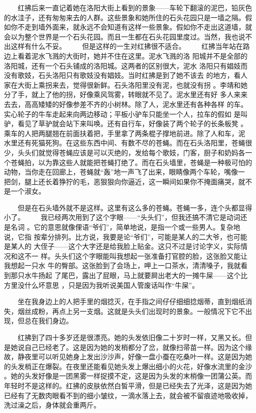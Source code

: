  　　红拂后来一直记着她在洛阳大街上看到的景象——车轮下翻滚的泥巴，铅灰色 的水洼子，还有匆匆来去的人群。这些景象和她所住的石头花园只是一墙之隔。假 如你不走到墙外面来，就永远不会知道有这样一些景象。假如你不走出这道墙，就 会以为整个世界是一个石头花园。而且一生都在石头花园里度过。当然，我也说不 出这样有什么不妥。 　　但是这样的一生对红拂很不适合。 　　红拂当年站在路边上看着泥水飞溅的大街时，她并不住在这里。泥水飞溅的洛 阳城并不是全部的洛阳城，还有一个石头铺成的洛阳城。这两者的区别很大，泥水 洛阳只有娼妓而没有歌妓，石头洛阳只有歌妓没有娼妓。当时红拂是到了她不该去 的地方，看人家在大街上乘拐来去，觉得很新鲜。石头洛阳里没有泥，也就没有拐 。李靖和她分了手，就上了他的拐，好像乘风驾雾，转眼就不见了。泥水里还有好 多人来来去去，高高矮矮的好像参差不齐的小树林。除了人，泥水里还有各种各样 的车。实心轮子的牛车走起来向两边移动；平板小驴车只能坐一个人，拉车的假如 是叫驴，看见了草驴就会站下来叫唤。还有自行车，好像装了两个轮子的长条板凳 。乘车的人把两腿翘在前面扶着把，手里拿了两条棍子撑地前进。除了人和车，泥 水里还有死猫死狗。在这些东西中间、有数不尽的苍蝇。而在石头洛阳里，苍蝇很 少，头头们就觉得苍蝇应该是可以灭绝的，发给每个歌妓，门客，厨子和奶妈各一 个苍蝇拍，以为靠这些人就能把苍蝇打绝了。而在石头墙里，苍蝇是一种极可怕的 动物，当你走在回廊上，苍蝇就“轰”地一声飞了出来，眼睛像两个车轮，嘴像一 把剑，腿上还长着狰狞的毛，恶狠狠向你逼近，这一瞬间如果你不掩面痛哭，就不 是一个淑女。 

　　但是在石头墙外就不是这样。这里有这么多的苍蝇。苍蝇一多，连个头都显得 小了。 　　我已经两次用到了这个字眼——“头头们”，但我还搞不清它是动词还是名词 。它的意思就像俚语“爷们”，简单地说，是指一个或一些男人。复杂地说，它指 按辈分排列。比方说，我要是论“爷们”，可能是某人的二大爷，也可能是某人的 大侄子——这个大字还是给我脸上贴金。这只不过是讨论字义，实际情况和这不一 样。头头们这个字眼能叫我想起一张准备打官腔的脸，这张脸又能让我想起一只水 牛的臀部。这张脸到了会场上，呷上一口茶水，清清嗓子，我就看到那只水牛扬起 了尾巴，露出了屁眼，马上就要屙出老大的一摊牛屎——这个比方里没什么坏意思 ，只是因为我听说美国人管废话叫作“牛屎”。 

　　坐在我身边上的人把手里的烟捻灭，在手指之间仔仔细细捻烟蒂，直到烟纸消 失，烟丝成粉，再点上另一支烟。这就是头头们出现时的景象。一般情况下它不出 现，但总在我们身边。

 　　红拂到了四十多岁还是很漂亮。她的头发依旧像二十岁时一样，又黑又长。但 是她说自己已经老了。这是因为她的发梢都分了岔，就像扫帚苗一样。因为这个缘 故，静夜里可以听见她身上发出沙沙声，好像一盘小蚕在吃桑叶一样。这是因为她 的头发梢正在爆裂。在夜里还能看见她头发上爆出细小的火花，好像水流里的金沙 。她的头发好像是一团黑雾一样捉摸不定，这是因为头发的末梢像一团蒲公英。而 年轻时不是这样的。红拂的皮肤依然白皙平滑，但是已经失去了光泽，这是因为她 已经有了无数肉眼看不到的细小皱纹，一滴水落上去，就会被不留痕迹地吸收掉， 洗过澡之后，身体就会重两斤。

